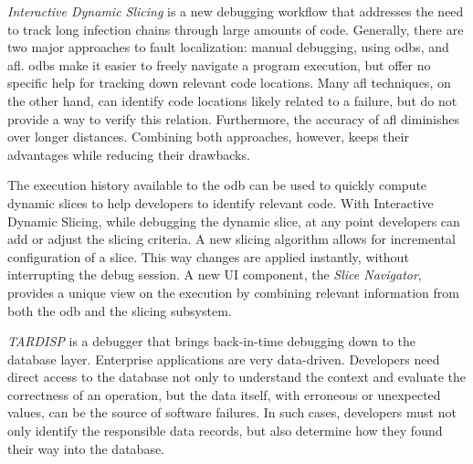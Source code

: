 


\emph{Interactive Dynamic Slicing} is a new debugging workflow that addresses the need to track long infection chains through large amounts of code.
Generally, there are two major approaches to fault localization: manual debugging, \eg using \acp{odb}, and \acf{afl}.
\Acp{odb} make it easier to freely navigate a program execution, but offer no specific help for tracking down relevant code locations.
Many \ac{afl} techniques, on the other hand, can identify code locations likely related to a failure, but do not provide a way to verify this relation.
Furthermore, the accuracy of \ac{afl} diminishes over longer distances.
Combining both approaches, however, keeps their advantages while reducing their drawbacks.

The execution history available to the \ac{odb} can be used to quickly compute dynamic slices to help developers to identify relevant code.
With Interactive Dynamic Slicing, while debugging the dynamic slice, at any point developers can add or adjust the slicing criteria.
A new slicing algorithm allows for incremental configuration of a slice. 
This way changes are applied instantly, without interrupting the debug session. 
A new UI component, the \emph{Slice Navigator}, provides a unique view on the execution by combining relevant information from both the \ac{odb} and the slicing subsystem.



\emph{TARDISP} is a debugger that brings back-in-time debugging down to the database layer.
Enterprise applications are very data-driven.
Developers need direct access to the database not only to understand the context and evaluate the correctness of an operation, but the data itself, with erroneous or unexpected values, can be the source of software failures.
In such cases, developers must not only identify the responsible data records, but also determine how they found their way into the database.

